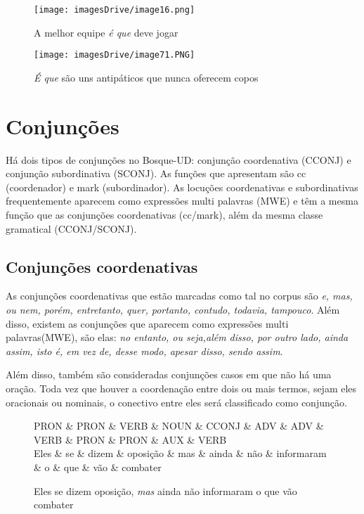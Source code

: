 \documentclass[output=paper,colorlinks,citecolor=brown]{langscibook}
\begin{document}
		\begin{figure}
    	\centering
    	\texttt{[image: imagesDrive/image16.png]}
    	\caption{A melhor equipe \emph{é que} deve jogar}
    	\label{fig:equeMWE2}
    	\end{figure}{}

	\begin{figure}
    	\centering
    	\texttt{[image: imagesDrive/image71.PNG]}
    	\caption{\emph{É que} são uns antipáticos que nunca oferecem copos}
    	\label{fig:equeMWE3}
    	\end{figure}{}

\section{Conjunções}

Há dois tipos de conjunções no Bosque-UD: conjunção coordenativa (CCONJ) e conjunção subordinativa (SCONJ). As funções que apresentam são cc (coordenador) e mark (subordinador). As locuções coordenativas e subordinativas frequentemente aparecem como expressões multi palavras (MWE) e têm a mesma função que as conjunções coordenativas (cc/mark), além da mesma classe gramatical (CCONJ/SCONJ).

\subsection{Conjunções coordenativas}

As conjunções coordenativas que estão marcadas como tal no corpus são \emph{e, mas, ou nem, porém, entretanto, quer, portanto, contudo, todavia, tampouco}. Além disso, existem as conjunções que aparecem como expressões multi palavras(MWE), são elas: \emph{no entanto, ou seja,além disso, por outro lado, ainda assim, isto é, em vez de, desse modo, apesar disso, sendo assim}.

Além disso, também são consideradas conjunções casos em que não há uma oração. Toda vez que houver a coordenação entre dois ou mais termos, sejam eles oracionais ou nominais, o conectivo entre eles será classificado como conjunção.

\begin{figure*}[htbp]
			\centering
			\vspace{.8cm}
			\begin{dependency}
				\begin{deptext}
					PRON \& PRON \& VERB \& NOUN \& CCONJ \& ADV \& ADV \& VERB \& PRON \& PRON \& 						AUX \& VERB\\
					Eles \& se \& dizem \& oposição \& mas \& ainda \& não \& informaram \& o \& que \& vão \& 							combater \\
				\end{deptext}
				
			\end{dependency}
			\caption{Eles se dizem oposição, \emph{mas} ainda não informaram o que vão combater}
			\label{dep:mas}
		\end{figure*}
\end{document}
